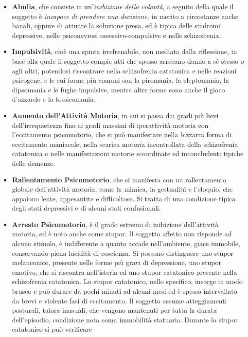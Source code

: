 \begin{itemize}
\item
  \textbf{Abulia}, che consiste in un'\emph{inibizione della volontà}, a
  seguito della quale il soggetto è \emph{incapace di prendere una
  decisione}, in merito a circostanze anche banali, oppure di attuare la
  soluzione presa, ed è tipica delle sindromi depressive, nelle
  psiconevrosi ossessivo-compulsive e nelle schizofrenia.
\item
  \textbf{Impulsività}, cioè una spinta irrefrenabile, non mediata dalla
  riflessione, in base alla quale il soggetto compie atti che spesso
  arrecano danno a sé stesso o agli altri, potendosi riscontrare nella
  schizofrenia catatonica e nelle reazioni psicogene, e le cui forme più
  comuni son la piromania, la cleptomania, la dipsomania e le fughe
  impulsive, mentre altre forme sono anche il gioco d'azzardo e la
  tossicomania.
\item
  \textbf{Aumento dell'Attività Motoria}, in cui si passa dai gradi più
  lievi dell'irrequietezza fino ai gradi massimi di iperattività motoria
  con l'eccitamento psicomotorio, che si può manifestare nella bizzarra
  forma di eccitamento maniacale, nella scarica motoria incontrollata
  della schizofrenia catatonica o nelle manifestazioni motorie
  scoordinate ed inconcludenti tipiche delle demenze.
\item
  \textbf{Rallentamento Psicomotorio}, che si manifesta con un
  rallentamento globale dell'attività motoria, come la mimica, la
  gestualità e l'eloquio, che appaiono lente, appesantite e
  difficoltose. Si tratta di una condizione tipica degli stati
  depressivi e di alcuni stati confusionali.
\item
  \textbf{Arresto Psicomotorio}, è il grado estremo di inibizione
  dell'attività motoria, ed è noto anche come stupor. Il soggetto
  affetto non risponde ad alcuno stimolo, è indifferente a quanto accade
  nell'ambiente, giace immobile, conservando piena lucidità di
  coscienza. Si possono distinguere uno stupor melanconico, presente
  nelle forme più gravi di depressione, uno stupor emotivo, che si
  riscontra nell'isteria ed uno stupor catatonico presente nella
  schizofrenia catatonica. Lo stupor catatonico, nello specifico,
  insorge in modo brusco e può durare da pochi minuti ad alcuni mesi ed
  è spesso intervallato da brevi e violente fasi di eccitamento. Il
  soggetto assume atteggiamenti posturali, talora inusuali, che vengono
  mantenuti per tutta la durata dell'episodio, condizione nota coma
  immobilità statuaria. Durante lo stupor catatonico si può verificare

\end{itemize}
